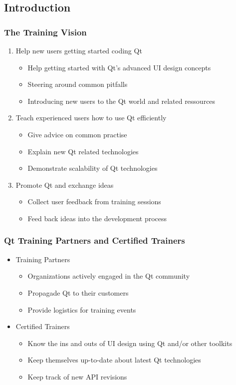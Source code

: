 \subsection{Introduction}

\begin{slide}
  \frametitle{The Training Vision}
  \begin{enumerate}
    \item Help new users getting started coding Qt
    \begin{itemize}
      \item Help getting started with Qt's advanced UI design concepts
      \item Steering around common pitfalls
      \item Introducing new users to the Qt world and related ressources
    \end{itemize}
    \item Teach experienced users how to use Qt efficiently
    \begin{itemize}
      \item Give advice on common practise
      \item Explain new Qt related technologies
      \item Demonstrate scalability of Qt technologies
    \end{itemize}
    \item Promote Qt and exchange ideas
    \begin{itemize}
      \item Collect user feedback from training sessions
      \item Feed back ideas into the development process
    \end{itemize}
  \end{enumerate}
\end{slide}

\begin{slide}
  \frametitle{Qt Training Partners and Certified Trainers}
  \begin{itemize}
    \item Training Partners
    \begin{itemize}
      \item Organizations actively engaged in the Qt community
      \item Propagade Qt to their customers
      \item Provide logistics for training events
    \end{itemize}
    \item Certified Trainers
    \begin{itemize}
      \item Know the ins and outs of UI design using Qt and/or other toolkits
      \item Keep themselves up-to-date about latest Qt technologies
      \item Keep track of new API revisions
    \end{itemize}
  \end{itemize}
\end{slide}

